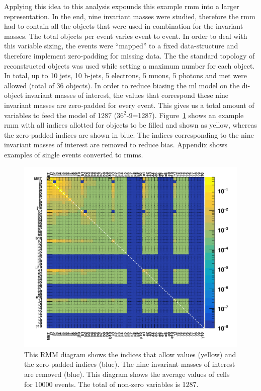 Applying this idea to this analysis expounds this example \gls{rmm} into a larger representation. In the end, nine invariant masses were studied, therefore the \gls{rmm} had to contain all the objects that were 
used in combination for the invariant masses. The total objects per event varies event to event. In order to deal with this variable sizing, the events were ``mapped'' to a fixed data-structure and therefore 
implement zero-padding for missing data. The the standard topology of reconstructed objects was used while setting a maximum number for each object. In total, up to 10 jets, 10 b-jets, 5 electrons, 5 muons, 
5 photons and \gls{met} were allowed (total of 36 objects). In order to reduce biasing the \gls{ml} model on the di-object invariant masses of interest, the values that correspond these nine invariant masses are zero-padded 
for every event. This gives us a total amount of variables to feed the model of 1287 ($\textrm{36}^{\textrm{2}}$-9=1287). Figure~\ref{fig:zero-rmm} shows an example \gls{rmm} with all indices allotted for objects to be filled and 
shown as yellow, whereas the zero-padded indices are shown in blue. The indices corresponding to the nine invariant masses of interest are removed to reduce bias. Appendix shows examples of single events converted to \gls{rmm}s.

\begin{figure}[H]
    \centering
    \includegraphics[scale=0.82]{figs/ch6/rmm/make_0removal.pdf}
    \caption{ This RMM diagram shows the indices that allow values (yellow) and the zero-padded indices (blue). The nine invariant masses of interest are removed (blue). This diagram shows the average values of cells for 10000 events. The total of non-zero variables is 1287.}
\label{fig:zero-rmm}
\end{figure}

